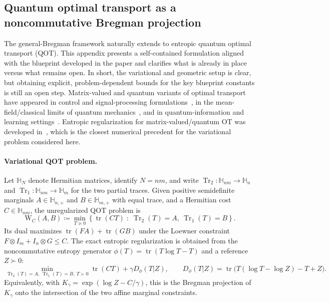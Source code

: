 \documentclass{article}
\theoremstyle{plain}
\newcommand{\eqdef}{\coloneqq}
\begin{document}
\subsection{Quantum optimal transport as a noncommutative Bregman projection}
\label{app-app:quantum-ot}

The general-Bregman framework naturally extends to entropic quantum optimal transport (QOT). This appendix presents a self-contained formulation aligned with the blueprint developed in the paper and clarifies what is already in place versus what remains open. In short, the variational and geometric setup is clear, but obtaining explicit, problem-dependent bounds for the key blueprint constants is still an open step. Matrix-valued and quantum variants of optimal transport have appeared in control and signal-processing formulations~\citep{ning2014matrix}, in the mean-field/classical limits of quantum mechanics~\citep{golse2016mean,caglioti2019quantum}, and in quantum-information and learning settings~\citep{chakrabarti2019quantum}. Entropic regularization for matrix-valued/quantum OT was developed in~\citep{peyre2019quantum}, which is the closest numerical precedent for the variational problem considered here.

\paragraph{Variational QOT problem.}
Let $\mathbb{H}_N$ denote Hermitian matrices, identify $N=nm$, and write $\operatorname{Tr}_2:\mathbb{H}_{nm}\to\mathbb{H}_n$ and $\operatorname{Tr}_1:\mathbb{H}_{nm}\to\mathbb{H}_m$ for the two partial traces. Given positive semidefinite marginals $A\in\mathbb{H}_{n,+}$ and $B\in\mathbb{H}_{m,+}$ with equal trace, and a Hermitian cost $C\in\mathbb{H}_{nm}$, the unregularized QOT problem is
\[
\mathrm W_C(A,B)
\eqdef
\min_{T\succeq 0}
\left\{
\operatorname{tr}(CT)
\;:\;
\operatorname{Tr}_2(T)=A,\ 
\operatorname{Tr}_1(T)=B
\right\}.
\]
Its dual maximizes $\operatorname{tr}(FA)+\operatorname{tr}(GB)$ under the Loewner constraint $F\otimes I_m+I_n\otimes G\le C$. The exact entropic regularization is obtained from the noncommutative entropy generator $\phi(T)=\operatorname{tr}(T\log T-T)$ and a reference $Z\succ0$:
\[
\min_{\operatorname{Tr}_2(T)=A,\ \operatorname{Tr}_1(T)=B,\ T\succ0}
\operatorname{tr}(CT)+\gamma D_{\phi}(T|Z),
\qquad
D_\phi(T|Z)
=
\operatorname{tr}\bigl(T(\log T-\log Z)-T+Z\bigr).
\]
Equivalently, with $K_\gamma=\exp(\log Z-C/\gamma)$, this is the Bregman projection of $K_\gamma$ onto the intersection of the two affine marginal constraints.
\end{document}
